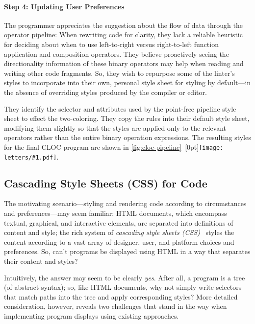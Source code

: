 \documentclass[acmsmall, screen]{acmart}
\newcommand{\parahead}[1]
  {\paragraph{\textbf{#1}}}
\newcommand{\figBubble}[1]{\raisebox{-0.03in}[0pt]{\texttt{[image: letters/\#1.pdf]}}}
\newcommand{\refBubble}[1]
  {~\figBubble{#1}}
\begin{document}
\parahead{Step 4: Updating User Preferences}

The programmer appreciates the suggestion about the flow of data through the operator pipeline:
When rewriting code for clarity, they lack a reliable heuristic for deciding about when to use left-to-right versus right-to-left function application and composition operators.
They believe proactively seeing the directionality information of these binary operators may help when reading and writing other code fragments.
So, they wish to repurpose some of the linter's styles to incorporate into their own, personal style sheet for styling by default---in the absence of overriding styles produced by the compiler or editor.

They identify the selector and attributes used by the point-free pipeline style sheet to effect the two-coloring.
They copy the rules into their default style sheet, modifying them slightly so that the styles are applied only to the relevant operators rather than the entire binary operation expressions.
The resulting styles for the final CLOC program are shown in \autoref{fig:cloc-pipeline}\refBubble{h}.

\subsection{Cascading Style Sheets (CSS) for Code}
\label{sec:intro-css-for-code}



\newcommand{\keyChallenge}[1]
  {#1}


\newcommand{\keyInsight}[1]
  {#1}


The motivating scenario---styling and rendering code according to circumstances and preferences---may seem familiar:
HTML documents, which encompass textual, graphical, and interactive elements, are separated into definitions of content and style; the rich system of \emph{cascading style sheets (CSS)}~\cite{css} styles the content according to a vast array of designer, user, and platform choices and preferences.
So, can't programs be displayed using HTML in a way that separates their content and styles?

Intuitively, the answer may seem to be clearly \emph{yes}. After all, a program is a tree (of abstract syntax); so, like HTML documents, why not simply write selectors that match paths into the tree and apply corresponding styles?
More detailed consideration, however, reveals two challenges that stand in the way when implementing program displays using existing approaches.
\end{document}
